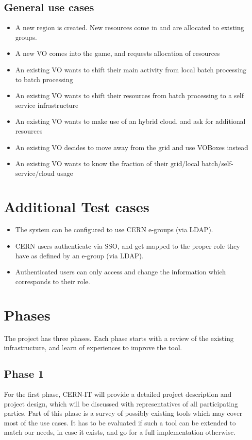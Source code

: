 \documentclass[12pt]{article}
\begin{document}
\subsection{General use cases}
\begin{itemize}
\item A new region is created. New resources come in and are allocated to existing groups.
\item A new VO comes into the game, and requests allocation of resources
\item An existing VO wants to shift their main activity from local batch processing to batch processing
\item An existing VO wants to shift their resources from batch processing to a self service infrastructure
\item An existing VO wants to make use of an hybrid cloud, and ask for additional resources
\item An existing VO decides to move away from the grid and use VOBoxes instead
\item An existing VO wants to know the fraction of their grid/local batch/self-service/cloud usage
\end{itemize}

\section{Additional Test cases}
\begin{itemize}
\item The system can be configured to use CERN e-groups (via LDAP). 
\item CERN users authenticate via SSO, and get mapped to the proper role they have as defined by an e-group (via LDAP).
\item Authenticated users can only access and change the information which corresponds to their role.
\end{itemize}

\section{Phases}

The project has three phases. Each phase starts with a review of the existing infrastructure, and learn of experiences to improve the tool.
 
\subsection{Phase 1}
For the first phase, CERN-IT will provide a detailed project description and project design, which will be
discussed with representatives of all participating parties. Part of this phase is a survey of possibly existing tools which 
may cover most of the use cases. 
It has to be evaluated if such a tool can be extended to match our needs, in case it exists, and go for a full implementation otherwise.
\end{document}
